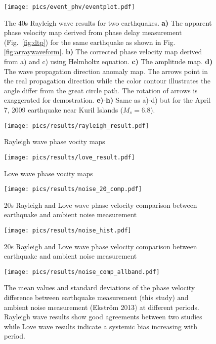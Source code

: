 \documentclass[referee]{gji}
\begin{document}
{{\begin{figure}
	\texttt{[image: pics/event\_phv/eventplot.pdf]}
	\caption{The 40s Rayleigh wave results for two earthquakes. \textbf{a)} The apparent phase velocity map derived from phase delay measurement (Fig.~\ref{fig:dtp}) for the same earthquake as shown in Fig.\ref{fig:arraywaveform}. \textbf{b)} The corrected phase velocity map derived from a) and c) using Helmholtz equation. \textbf{c)} The amplitude map. \textbf{d)} The wave propagation direction anomaly map. The arrows point in the real propagation direction while the color contour illustrates the angle differ from the great circle path. The rotation of arrows is exaggerated for demostration. \textbf{e)}-\textbf{h)} Same as a)-d) but for the April 7, 2009 earthquake near Kuril Islands ($M_s=6.8$).}
	\label{fig:eventfig}
\end{figure}


\begin{figure}
	\texttt{[image: pics/results/rayleigh\_result.pdf]}
	\caption{Rayleigh wave phase vocity maps}
	\label{fig:rayleigh_result}
\end{figure}

\begin{figure}
	\texttt{[image: pics/results/love\_result.pdf]}
	\caption{Love wave phase vocity maps}
	\label{fig:love_result}
\end{figure}

\begin{figure}
	\texttt{[image: pics/results/noise\_20\_comp.pdf]}
	\caption{20s Rayleigh and Love wave phase velocity comparison between earthquake and ambient noise measurement}
	\label{fig:noise_comp}
\end{figure}

\begin{figure}
	\texttt{[image: pics/results/noise\_hist.pdf]}
	\caption{20s Rayleigh and Love wave phase velocity comparison between earthquake and ambient noise measurement}
	\label{fig:noise_hist}
\end{figure}

\begin{figure}
	\texttt{[image: pics/results/noise\_comp\_allband.pdf]}
	\caption{The mean values and standard deviations of the phase velocity difference between earthquake measurement (this study) and ambient noise measurement (Ekstr\"{o}m 2013) at different periods. Rayleigh wave results show good agreements between two studies while Love wave results indicate a systemic bias increasing with period.  }
	\label{fig:noise_comp_allband}
\end{figure}

}}
\end{document}
